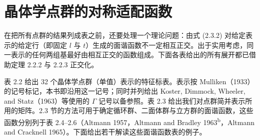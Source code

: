 \section{晶体学点群的对称适配函数}

在把所有点群的结果列成表之前，还要处理一个理论问题：由式 (2.3.2) 对给定表示的给定行（即固定 $l$ 与 $t$）生成的面谐函数不一定相互正交。出于实用考虑，同一表示的任何两组基最好由相互正交的函数组成。下面各表给出的所有展开都已借助定理 2.2.2 与 2.2.3 正交化。

表 2.2 给出 32 个晶体学点群（单值）表示的特征标表。表示按 Mulliken（1933）的记号标记，本书即沿用这一记号；同时并列给出 Koster, Dimmock, Wheeler, and Statz（1963）等使用的 $\Gamma$ 记号以备参照。表 2.3 给出我们对点群简并表示所用的矩阵。2.3 节的方法可用于确定循环群、二面体群与立方群的面谐函数，这些函数分别列于表 2.4--2.6（Altmann 1957，Altmann and Bradley 1963\textsuperscript{b}，Altmann and Cracknell 1965）。下面给出若干解读这些面谐函数表的例子。

